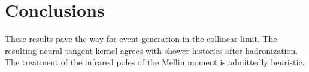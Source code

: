 \section{Conclusions}\label{sec:conclusions}

These results pave the way for event generation in the collinear limit.
The resulting neural tangent kernel agrees with shower histories after
hadronization. The treatment of the infrared poles of the Mellin moment
is admittedly heuristic.

